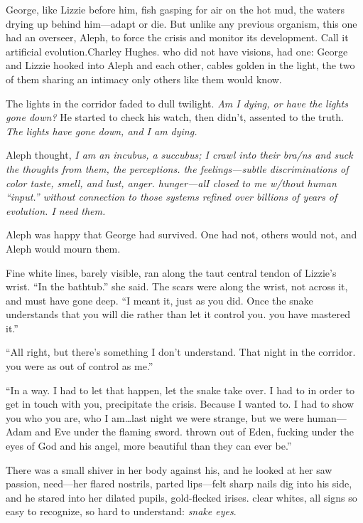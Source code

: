 George, like Lizzie before him, fish gasping for air on the hot mud, the waters drying up behind him—adapt or die. But unlike any previous organism, this one had an overseer, Aleph, to force the crisis and monitor its development. Call it artificial evolution.Charley Hughes. who did not have visions, had one: George and Lizzie hooked into Aleph and each other, cables golden in the light, the two of them sharing an intimacy only others like them would know.

The lights in the corridor faded to dull twilight. \textit{Am I dying, or have the lights gone down?} He started to check his watch, then didn't, assented to the truth. \textit{The lights have gone down, and I am dying.}

Aleph thought, \textit{I am an incubus, a succubus; I crawl into their bra/ns and suck the thoughts from them, the perceptions. the feelings—subtle discriminations of color taste, smell, and lust, anger. hunger—alI closed to me w/thout human ``input.'' without connection to those systems refined over billions of years of evolution. I need them.}

Aleph was happy that George had survived. One had not, others would not, and Aleph would mourn them.

Fine white lines, barely visible, ran along the taut central tendon of Lizzie's wrist. ``In the bathtub.'' she said. The scars were along the wrist, not across it, and must have gone deep. ``I meant it, just as you did. Once the snake understands that you will die rather than let it control you. you have mastered it.''

``All right, but there's something I don't understand. That night in the corridor. you were as out of control as me.''

``In a way. I had to let that happen, let the snake take over. I had to in order to get in touch with you, precipitate the crisis. Because I wanted to. I had to show you who you are, who I am\ldots last night we were strange, but we were human—Adam and Eve under the flaming sword. thrown out of Eden, fucking under the eyes of God and his angel, more beautiful than they can ever be.''

There was a small shiver in her body against his, and he looked at her saw passion, need—her flared nostrils, parted lips—felt sharp nails dig into his side, and he stared into her dilated pupils, gold-flecked irises. clear whites, all signs so easy to recognize, so hard to understand: \textit{snake eyes}.     